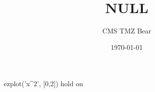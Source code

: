 \documentclass[UTF8]{ctexart}
\title{NULL}
\author{CMS TMZ Bear}
\date{\today}
\begin{document}
\maketitle
\begin{lstlistings}
    ezplot('x^2', [0,2])
    hold on
\end{lstlistings}
\end{document}
